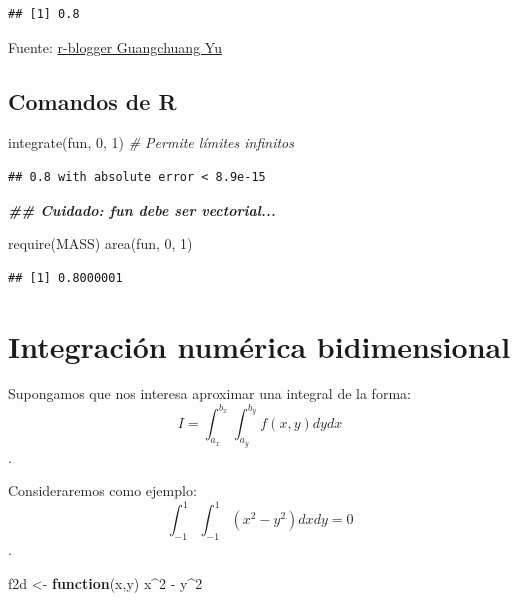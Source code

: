 \documentclass[
]{book}
\newenvironment{Shaded}{\begin{snugshade}}{\end{snugshade}}
\newcommand{\CommentTok}[1]{\textcolor[rgb]{0.56,0.35,0.01}{\textit{#1}}}
\newcommand{\ControlFlowTok}[1]{\textcolor[rgb]{0.13,0.29,0.53}{\textbf{#1}}}
\newcommand{\DecValTok}[1]{\textcolor[rgb]{0.00,0.00,0.81}{#1}}
\newcommand{\DocumentationTok}[1]{\textcolor[rgb]{0.56,0.35,0.01}{\textbf{\textit{#1}}}}
\newcommand{\FunctionTok}[1]{\textcolor[rgb]{0.00,0.00,0.00}{#1}}
\newcommand{\NormalTok}[1]{#1}
\newcommand{\OtherTok}[1]{\textcolor[rgb]{0.56,0.35,0.01}{#1}}
\newcommand{\SpecialCharTok}[1]{\textcolor[rgb]{0.00,0.00,0.00}{#1}}
\theoremstyle{break}
\theoremstyle{definition}
\theoremstyle{definition}
\theoremstyle{definition}
\theoremstyle{definition}
\theoremstyle{remark}
\begin{document}
\begin{verbatim}
## [1] 0.8
\end{verbatim}

Fuente: \href{https://www.r-bloggers.com/one-dimensional-integrals}{r-blogger Guangchuang Yu}

\hypertarget{comandos-de-r}{%
\subsection{Comandos de R}\label{comandos-de-r}}

\begin{Shaded}
\begin{Highlighting}[]
\FunctionTok{integrate}\NormalTok{(fun, }\DecValTok{0}\NormalTok{, }\DecValTok{1}\NormalTok{)   }\CommentTok{\# Permite límites infinitos  }
\end{Highlighting}
\end{Shaded}

\begin{verbatim}
## 0.8 with absolute error < 8.9e-15
\end{verbatim}

\begin{Shaded}
\begin{Highlighting}[]
\DocumentationTok{\#\# Cuidado: fun debe ser vectorial...}

\FunctionTok{require}\NormalTok{(MASS)}
\FunctionTok{area}\NormalTok{(fun, }\DecValTok{0}\NormalTok{, }\DecValTok{1}\NormalTok{)}
\end{Highlighting}
\end{Shaded}

\begin{verbatim}
## [1] 0.8000001
\end{verbatim}

\hypertarget{integraciuxf3n-numuxe9rica-bidimensional}{%
\section{Integración numérica bidimensional}\label{integraciuxf3n-numuxe9rica-bidimensional}}

Supongamos que nos interesa aproximar una integral de la forma:
\[I=\int_{a_x}^{b_x}\int_{a_y}^{b_y}f(x, y)dy dx\].

Consideraremos como ejemplo:
\[\int_{-1}^{1} \int_{-1}^{1} \left( x^2 - y^2 \right) dx dy = 0\].

\begin{Shaded}
\begin{Highlighting}[]
\NormalTok{f2d }\OtherTok{\textless{}{-}} \ControlFlowTok{function}\NormalTok{(x,y) x}\SpecialCharTok{\^{}}\DecValTok{2} \SpecialCharTok{{-}}\NormalTok{ y}\SpecialCharTok{\^{}}\DecValTok{2}
\end{Highlighting}
\end{Shaded}
\end{document}
